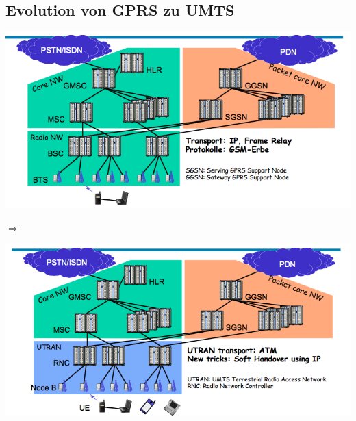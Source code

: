 \subsection{Evolution von GPRS zu UMTS}
\begin{minipage}{0.45\linewidth}
\includegraphics[width = \linewidth]{./Pics/UMTS4}
\end{minipage}
\begin{minipage}{0.1\linewidth}
$\Rightarrow$
\end{minipage}
\begin{minipage}{0.45\linewidth}
\includegraphics[width = \linewidth]{./Pics/UMTS5}
\end{minipage}

